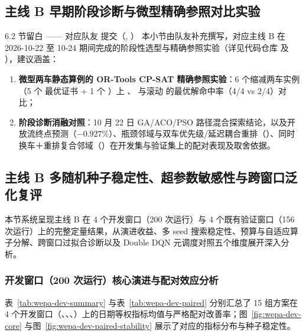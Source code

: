 \subsection{主线 B 早期阶段诊断与微型精确参照对比实验}

\begin{teammatebox}{6.2 节留白 —— 对应队友  提交（,  ）}
  本小节由队友补充撰写，对应主线 B 在 2026-10-22 至 10-24 期间完成的阶段性选型与精确参照实验（详见代码仓库  及 ），建议涵盖：
  \begin{enumerate}
    \item \textbf{微型两车静态算例的 OR-Tools CP-SAT 精确参照实验}：6 个缩减两车实例（5 个  最优证书 + 1 个 ）上 、 与滚动  的最优解命中率（4/4 vs 2/4）对比；
    \item \textbf{阶段诊断消融对照}：10 月 22 日 GA/ACO/PSO 路径混合探索结论，以及开放流终点预测（$-0.927\%$）、瓶颈邻域与双车优先级/延迟耦合重排（）、同时换车＋重排复合邻域（）在开发集与验证集上的配对表现及取舍依据。
  \end{enumerate}
\end{teammatebox}

\subsection{主线 B 多随机种子稳定性、超参数敏感性与跨窗口泛化复评}

本节系统呈现主线 B 在 4 个开发窗口（200 次运行）与 4 个既有验证窗口（156 次运行）上的完整定量结果，从演进收益、多 seed 搜索稳定性、预算与自适应算子分解、跨窗口过拟合诊断以及 Double DQN 元调度对照五个维度展开深入分析。

\subsubsection{开发窗口（200 次运行）核心演进与配对效应分析}

表~\ref{tab:wepa-dev-summary} 与表~\ref{tab:wepa-dev-paired} 分别汇总了 15 组方案在 4 个开发窗口（、、、）上的日期等权指标均值与严格配对改善率；图~\ref{fig:wepa-dev-core} 与图~\ref{fig:wepa-dev-paired-stability} 展示了对应的指标分布与种子稳定性。

